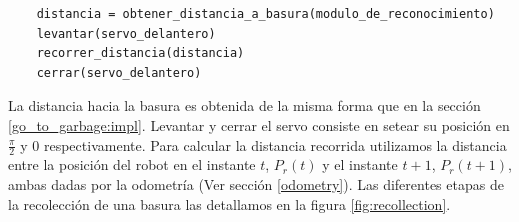 \begin{verbatim}
    distancia = obtener_distancia_a_basura(modulo_de_reconocimiento)
    levantar(servo_delantero)
    recorrer_distancia(distancia)
    cerrar(servo_delantero)
\end{verbatim}

La distancia hacia la basura es obtenida de la misma forma que en la secci\'on
\ref{go_to_garbage:impl}. Levantar y cerrar el servo consiste en setear su
posici\'on en $\frac{\pi}{2}$ y $0$ respectivamente. Para calcular la distancia
recorrida utilizamos la distancia entre la posici\'on del robot en el
instante $t$, $P_r(t)$ y el instante $t+1$, $P_r(t+1)$, ambas dadas por la
odometr\'ia (Ver secci\'on \ref{odometry}). Las diferentes etapas de la
recolecci\'on de una basura las detallamos en la figura \ref{fig:recollection}.

